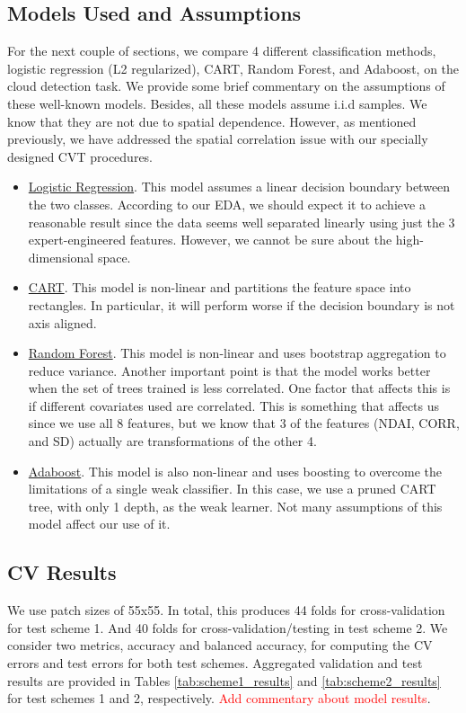 \documentclass[11pt, letterpaper, journal]{IEEEtran}
\begin{document}
\subsection{Models Used and Assumptions}
For the next couple of sections, we compare 4 different classification methods, logistic regression (L2 regularized), CART, Random Forest, and Adaboost, on the cloud detection task. We provide some brief commentary on the assumptions of these well-known models. Besides, all these models assume i.i.d samples. We know that they are not due to spatial dependence. However, as mentioned previously, we have addressed the spatial correlation issue with our specially designed CVT procedures. 
\begin{itemize}
    \item \underline{Logistic Regression}. This model assumes a linear decision boundary between the two classes. According to our EDA, we should expect it to achieve a reasonable result since the data seems well separated linearly using just the 3 expert-engineered features. However, we cannot be sure about the high-dimensional space.
    \item \underline{CART}. This model is non-linear and partitions the feature space into rectangles. In particular, it will perform worse if the decision boundary is not axis aligned. 
    \item \underline{Random Forest}. This model is non-linear and uses bootstrap aggregation to reduce variance. Another important point is that the model works better when the set of trees trained is less correlated. One factor that affects this is if different covariates used are correlated. This is something that affects us since we use all 8 features, but we know that 3 of the features (NDAI, CORR, and SD) actually are transformations of the other 4.
    \item \underline{Adaboost}. This model is also non-linear and uses boosting to overcome the limitations of a single weak classifier. In this case, we use a pruned CART tree, with only 1 depth, as the weak learner. Not many assumptions of this model affect our use of it.
\end{itemize}


\subsection{CV Results}
We use patch sizes of 55x55. In total, this produces 44 folds for cross-validation for test scheme 1. And 40 folds for cross-validation/testing in test scheme 2. We consider two metrics, accuracy and balanced accuracy, for computing the CV errors and test errors for both test schemes. Aggregated validation and test results are provided in Tables \ref{tab:scheme1_results} and \ref{tab:scheme2_results} for test schemes 1 and 2, respectively. \textcolor{red}{Add commentary about model results}.
\end{document}

